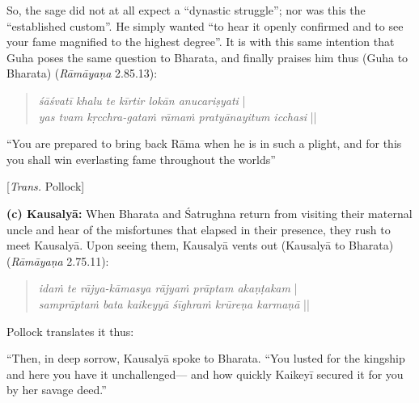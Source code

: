 So, the sage did not at all expect a “dynastic struggle”; nor was this the “established custom”. He simply wanted “to hear it openly confirmed and to see your fame magnified to the highest degree”. It is with this same intention that Guha poses the same question to Bharata, and finally praises him thus (Guha to Bharata) ({\sl Rāmāyaṇa} 2.85.13): 
\begin{quote}
{{\sl śāśvatī khalu te kīrtir lokān anucariṣyati}}\label{verse25} |\\
{\sl yas tvam kṛcchra-gataṁ rāmaṁ pratyānayitum icchasi} || 
\end{quote}

\begin{myquote}
“You are prepared to bring back Rāma when he is in such a plight, and for this you shall win everlasting fame throughout the worlds”

\hfill [{\sl Trans.} Pollock]
\end{myquote}

\noindent
\textbf{(c) Kausalyā:}  When Bharata and Śatrughna return from visiting their maternal uncle and hear of the misfortunes that elapsed in their presence, they rush to meet Kausalyā. Upon seeing them, Kausalyā vents out (Kausalyā to Bharata) ({\sl Rāmāyaṇa} 2.75.11): 
\begin{quote}
{{\sl idaṁ te rājya-kāmasya rājyaṁ prāptam akaṇṭakam}}\label{verse24} |\\
{\sl samprāptaṁ bata kaikeyyā śīghraṁ krūreṇa karmaṇā} || 
\end{quote}

Pollock translates it thus:

\begin{myquote}
“Then, in deep sorrow, Kausalyā spoke to Bharata. “You lusted for the kingship and here you have it unchallenged--- and how quickly Kaikeyī secured it for you by her savage deed.”
\end{myquote}

